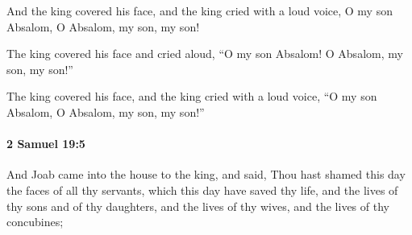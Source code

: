 			\begin{versebox}
					\item[BHS] 
					\item[ASV] And the king covered his face, and the king cried with a loud voice, O my son Absalom, O Absalom, my son, my son!
					\item[NIV] The king covered his face and cried aloud, “O my son Absalom! O Absalom, my son, my son!”
					\item[NRSV] The king covered his face, and the king cried with a loud voice, “O my son Absalom, O Absalom, my son, my son!”
			\end{versebox}

		\paragraph{2 Samuel 19:5} %
			\label{2SAMUEL-19-5}

			And Joab came into the house to the king, and said, Thou hast shamed this day the faces of all thy servants, which this day have saved thy life, and the lives of thy sons and of thy daughters, and the lives of thy wives, and the lives of thy concubines;

